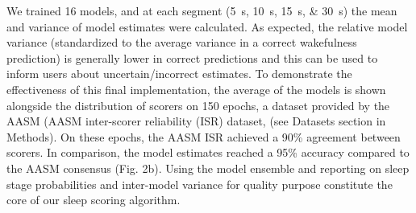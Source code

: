 We trained 16 models, and at each segment (\SIlist{5;10;15;30}{\second}) the mean and variance of model estimates were calculated. 
As expected, the relative model variance (standardized to the average variance in a correct wakefulness prediction) is generally lower in correct predictions and this can be used to inform users about uncertain/incorrect estimates. 
To demonstrate the effectiveness of this final implementation, the average of the models is shown alongside the distribution of  scorers on 150 epochs, a dataset provided by the AASM (AASM inter-scorer reliability (ISR) dataset, (see Datasets section in Methods). 
On these epochs, the AASM ISR achieved a 90\% agreement between scorers. 
In comparison, the model estimates reached a 95\% accuracy compared to the AASM consensus (Fig. 2b). 
Using the model ensemble and reporting on sleep stage probabilities and inter-model variance for quality purpose constitute the core of our sleep scoring algorithm.
